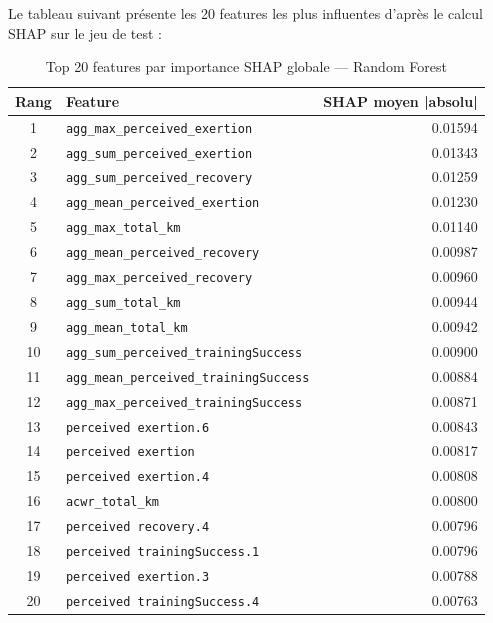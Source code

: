 \documentclass[12pt,a4paper]{report}
\begin{document}
Le tableau suivant présente les 20 features les plus influentes d'après le calcul SHAP
sur le jeu de test :

\begin{table}[H]
\centering
\small
\begin{tabular}{clr}
\toprule
\textbf{Rang} & \textbf{Feature} & \textbf{SHAP moyen |absolu|} \\
\midrule
1  & \texttt{agg\_max\_perceived\_exertion}      & 0.01594 \\
2  & \texttt{agg\_sum\_perceived\_exertion}      & 0.01343 \\
3  & \texttt{agg\_sum\_perceived\_recovery}      & 0.01259 \\
4  & \texttt{agg\_mean\_perceived\_exertion}     & 0.01230 \\
5  & \texttt{agg\_max\_total\_km}               & 0.01140 \\
6  & \texttt{agg\_mean\_perceived\_recovery}    & 0.00987 \\
7  & \texttt{agg\_max\_perceived\_recovery}     & 0.00960 \\
8  & \texttt{agg\_sum\_total\_km}               & 0.00944 \\
9  & \texttt{agg\_mean\_total\_km}              & 0.00942 \\
10 & \texttt{agg\_sum\_perceived\_trainingSuccess} & 0.00900 \\
11 & \texttt{agg\_mean\_perceived\_trainingSuccess} & 0.00884 \\
12 & \texttt{agg\_max\_perceived\_trainingSuccess}  & 0.00871 \\
13 & \texttt{perceived exertion.6}              & 0.00843 \\
14 & \texttt{perceived exertion}               & 0.00817 \\
15 & \texttt{perceived exertion.4}             & 0.00808 \\
16 & \texttt{acwr\_total\_km}                   & 0.00800 \\
17 & \texttt{perceived recovery.4}             & 0.00796 \\
18 & \texttt{perceived trainingSuccess.1}      & 0.00796 \\
19 & \texttt{perceived exertion.3}             & 0.00788 \\
20 & \texttt{perceived trainingSuccess.4}      & 0.00763 \\
\bottomrule
\end{tabular}
\caption{Top 20 features par importance SHAP globale — Random Forest}
\end{table}
\end{document}
